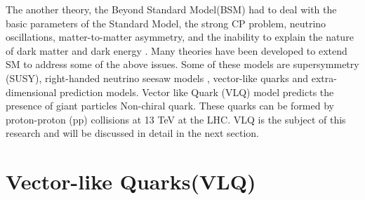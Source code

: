 The another theory, the Beyond Standard Model(BSM) had to deal with the basic parameters of the Standard Model, the strong CP problem, neutrino oscillations, matter-to-matter asymmetry, and the inability to explain the nature of dark matter and dark energy \cite{https://doi.org/10.48550/arxiv.1202.1391}. Many theories have been developed to extend  SM to address some of the above issues. Some of these models are supersymmetry (SUSY)\cite{MARTIN_1998}, right-handed neutrino seesaw models \cite{neutrino_mass_model}, vector-like quarks and extra-dimensional prediction models. Vector like Quark (VLQ) model predicts the presence of giant particles  Non-chiral quark. These quarks can be formed by proton-proton (pp) collisions at 13 TeV at the LHC. VLQ is the subject of this research and will be discussed in detail in the next section.




\section{Vector-like Quarks(VLQ)}


